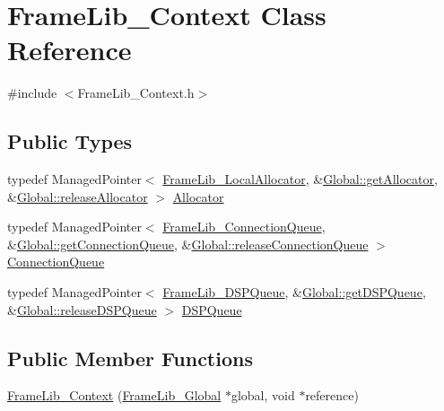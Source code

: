 \hypertarget{class_frame_lib___context}{}\section{Frame\+Lib\+\_\+\+Context Class Reference}
\label{class_frame_lib___context}


{\ttfamily \#include $<$Frame\+Lib\+\_\+\+Context.\+h$>$}

\subsection*{Public Types}
\begin{DoxyCompactItemize}
\item 
typedef Managed\+Pointer$<$ \hyperlink{class_frame_lib___local_allocator}{Frame\+Lib\+\_\+\+Local\+Allocator}, \&\hyperlink{class_frame_lib___global_a31c3fae37e27c9cce286d30ed30838d3}{Global\+::get\+Allocator}, \&\hyperlink{class_frame_lib___global_a78b0ff45eb662f12c41bdd641a416539}{Global\+::release\+Allocator} $>$ \hyperlink{class_frame_lib___context_a4cfa321c8f6048211d031f05156b5b19}{Allocator}
\item 
typedef Managed\+Pointer$<$ \hyperlink{class_frame_lib___connection_queue}{Frame\+Lib\+\_\+\+Connection\+Queue}, \&\hyperlink{class_frame_lib___global_ae0cfe1ff49ba163758fcb66f9e94b991}{Global\+::get\+Connection\+Queue}, \&\hyperlink{class_frame_lib___global_ab461ad3b4bdd9c580018373cf1617b1b}{Global\+::release\+Connection\+Queue} $>$ \hyperlink{class_frame_lib___context_ab71b26193867cfa080362bd19a87596b}{Connection\+Queue}
\item 
typedef Managed\+Pointer$<$ \hyperlink{class_frame_lib___d_s_p_queue}{Frame\+Lib\+\_\+\+D\+S\+P\+Queue}, \&\hyperlink{class_frame_lib___global_a5b4e45a675ea406538781011f7ebc153}{Global\+::get\+D\+S\+P\+Queue}, \&\hyperlink{class_frame_lib___global_a118b451294a2893fa60edfb09f60002a}{Global\+::release\+D\+S\+P\+Queue} $>$ \hyperlink{class_frame_lib___context_a1a18438b08e39c370de0e5794029ba77}{D\+S\+P\+Queue}
\end{DoxyCompactItemize}
\subsection*{Public Member Functions}
\begin{DoxyCompactItemize}
\item 
\hyperlink{class_frame_lib___context_a2cfe1912e3e9d835de291277c8979ed8}{Frame\+Lib\+\_\+\+Context} (\hyperlink{class_frame_lib___global}{Frame\+Lib\+\_\+\+Global} $\ast$global, void $\ast$reference)
\end{DoxyCompactItemize}


